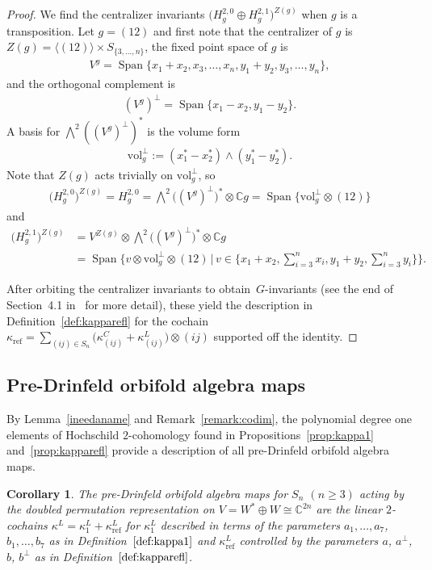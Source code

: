 \documentclass[10pt,a4paper]{amsart}
\numberwithin{equation}{section}
\newtheorem{Corollary}[Theorem]{Corollary}
\newcommand{\vol}[1]{\text{vol}_{#1}^{\perp}}
\DeclareMathOperator{\Span}{Span}
\DeclareMathOperator{\refl}{ref}
\begin{document}
\begin{proof}
We find the centralizer invariants $\big(H_g^{2,0}\oplus H_g^{2,1}\big)^{Z(g)}$ when $g$ is a transposition.
Let $g=(12)$ and first note that the centralizer of $g$ is $Z(g)=\langle (12) \rangle \times S_{\{3,\dots,n\}}$, the fixed point space of $g$ is
\begin{gather*}
V^g=\Span\{x_1+x_2,x_3,\dots,x_n,y_1+y_2,y_3,\dots,y_n\},
\end{gather*}
and the orthogonal complement is
\begin{gather*}
(V^g)^\perp=\Span\{x_1-x_2,y_1-y_2\}.
\end{gather*}
A basis for $\bigwedge^2 ((V^g)^{\perp})^*$
is the volume form
	\begin{gather*}
	\vol{g}:=(x_1^*-x_2^*)\wedge (y_1^*-y_2^*).
	\end{gather*}
Note that $Z(g)$ acts trivially on $\vol{g}$, so
 	\begin{gather*}
	\big(H_g^{2,0}\big)^{Z(g)}=H_g^{2,0}=\bigwedge\nolimits^{\! 2} \big((V^g)^{\perp}\big)^* \otimes \mathbb{C} g=\Span\big\{\vol{g} \otimes (12) \big\}
	\end{gather*}
and
\begin{align*}
\big(H_g^{2,1}\big)^{Z(g)}& =V^{Z(g)}\otimes\bigwedge\nolimits^{\! 2} \big((V^g)^{\perp}\big)^* \otimes \mathbb{C} g
\\
&=\Span\bigg\{v \otimes \vol{g} \otimes (12) \,\bigg\vert\, v \in \bigg\{x_1+x_2, \sum\limits_{i=3}^n x_i, y_1+y_2, \sum\limits_{i=3}^n y_i \bigg\}\bigg\}.
\end{align*}

After orbiting the centralizer invariants to obtain~$G$-invariants (see the end of Section~4.1 in~\cite{FGK} for more detail), these yield the description in Definition~\ref{def:kapparefl} for the cochain $\kappa_{\refl}=\sum_{(ij) \in S_n} \big(\kappa^C_{(ij)}+\kappa^L_{(ij)}\big)\otimes (ij)$ supported off the identity.
\end{proof}

\subsection{Pre-Drinfeld orbifold algebra maps}
By Lemma~\ref{ineedaname} and Remark~\ref{remark:codim}, the polynomial
degree one elements of Hochschild $2$-cohomology found in
Propositions~\ref{prop:kappa1} and~\ref{prop:kapparefl}
provide a description of all pre-Drinfeld orbifold algebra maps.

\begin{Corollary}
\label{preDOAmaps}
The pre-Drinfeld orbifold algebra maps for $S_n$ $(n\geq 3)$ acting
by the doubled permutation representation on
$V=W^* \oplus W \cong \mathbb{C}^{2n}$ are the linear $2$-cochains
$\kappa^L=\kappa^L_1+\kappa^L_{\refl}$ for $\kappa^L_1$ described in
terms of the parameters $a_1,\dots,a_7$, $b_1,\dots,b_7$ as in
Definition~$\ref{def:kappa1}$ and
$\kappa^L_{\refl}$ controlled by the
parameters $a$, $a^\perp$, $b$, $b^\perp$
as in Definition~$\ref{def:kapparefl}$.
\end{Corollary}
\end{document}
